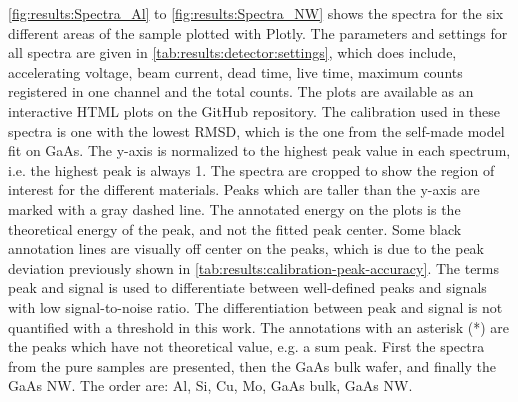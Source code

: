 \cref{fig:results:Spectra_Al} to \cref{fig:results:Spectra_NW} shows the spectra for the six different areas of the sample plotted with Plotly.
The parameters and settings for all spectra are given in \cref{tab:results:detector:settings}, which does include, accelerating voltage, beam current, dead time, live time, maximum counts registered in one channel and the total counts.
The plots are available as an interactive HTML plots on the GitHub repository.
The calibration used in these spectra is one with the lowest RMSD, which is the one from the self-made model fit on GaAs.
The y-axis is normalized to the highest peak value in each spectrum, i.e. the highest peak is always 1.
The spectra are cropped to show the region of interest for the different materials.
Peaks which are taller than the y-axis are marked with a gray dashed line.
The annotated energy on the plots is the theoretical energy of the peak, and not the fitted peak center.
Some black annotation lines are visually off center on the peaks, which is due to the peak deviation previously shown in \cref{tab:results:calibration-peak-accuracy}.
The terms peak and signal is used to differentiate between well-defined peaks and signals with low signal-to-noise ratio.
The differentiation between peak and signal is not quantified with a threshold in this work. %
The annotations with an asterisk (*) are the peaks which have not theoretical value, e.g. a sum peak.
First the spectra from the pure samples are presented, then the GaAs bulk wafer, and finally the GaAs NW.
The order are: Al, Si, Cu, Mo, GaAs bulk, GaAs NW.




